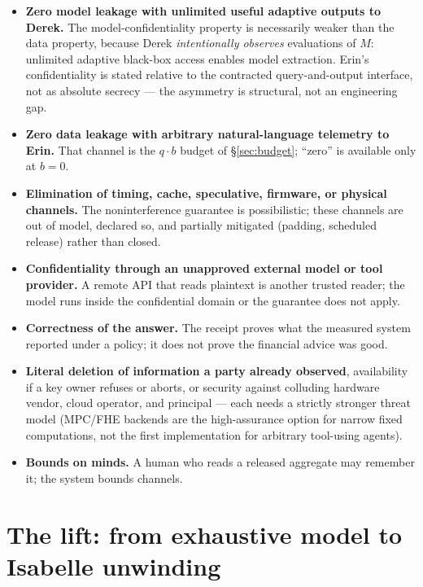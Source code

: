 \documentclass[11pt,a4paper]{article}
\begin{document}
\begin{itemize}
\item \textbf{Zero model leakage with unlimited useful adaptive outputs to Derek.} The
model-confidentiality property is necessarily weaker than the data property, because Derek \emph{intentionally observes}
evaluations of $M$: unlimited adaptive black-box access enables model extraction. Erin's confidentiality is stated relative to the
contracted query-and-output interface, not as absolute secrecy --- the asymmetry is structural, not an engineering gap.
\item \textbf{Zero data leakage with arbitrary natural-language telemetry to Erin.} That channel is
the $q\cdot b$ budget of \S\ref{sec:budget}; ``zero'' is available only at $b=0$.
\item \textbf{Elimination of timing, cache, speculative, firmware, or physical channels.} The
noninterference guarantee is possibilistic; these channels are out of model, declared so, and partially mitigated (padding,
scheduled release) rather than closed.
\item \textbf{Confidentiality through an unapproved external model or tool provider.} A remote API
that reads plaintext is another trusted reader; the model runs inside the confidential domain or the guarantee does not apply.
\item \textbf{Correctness of the answer.} The receipt proves what the measured system reported under
a policy; it does not prove the financial advice was good.
\item \textbf{Literal deletion of information a party already observed}, availability if a key owner
refuses or aborts, or security against colluding hardware vendor, cloud operator, and principal --- each needs a strictly stronger
threat model (MPC/FHE backends are the high-assurance option for narrow fixed computations, not the first implementation for
arbitrary tool-using agents).
\item \textbf{Bounds on minds.} A human who reads a released aggregate may remember it; the system
bounds channels.
\end{itemize}

\section{The lift: from exhaustive model to Isabelle unwinding}\label{sec:lift}
\end{document}

